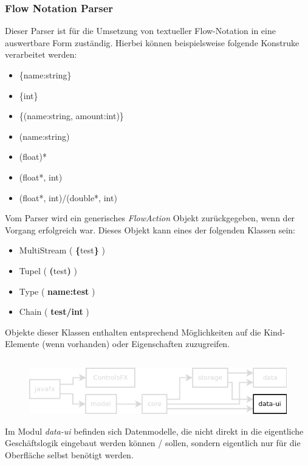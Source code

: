 \subsubsection{Flow Notation Parser}
Dieser Parser ist für die Umsetzung von textueller Flow-Notation in eine auswertbare Form zuständig. Hierbei können
beispielsweise folgende Konstruke verarbeitet werden:

\begin{itemize}
	\item \{name:string\}
	\item \{int\}
	\item \{(name:string, amount:int)\}
	\item (name:string)
	\item (float)*
	\item (float*, int)
	\item (float*, int)/(double*, int)
\end{itemize}
Vom Parser wird ein generisches \textit{FlowAction} Objekt zurückgegeben, wenn der Vorgang erfolgreich war. Dieses
Objekt kann eines der folgenden Klassen sein:

\begin{itemize}
	\item MultiStream ( \textbf{\{}test\textbf{\}} )
	\item Tupel ( \textbf{(}test\textbf{)} )
	\item Type ( \textbf{name:test} )
	\item Chain ( \textbf{test/int} )
\end{itemize}
Objekte dieser Klassen enthalten entsprechend Möglichkeiten auf die Kind-Elemente (wenn vorhanden) oder
Eigenschaften zuzugreifen.
\subsection{\textModDataUI}
\label{\textModDataUI}
\begin{figure}[H]
	\centering
	\includegraphics[width=.8\textwidth]{module_dependencies_data-ui.png}
\end{figure}

Im Modul \textit{data-ui} befinden sich Datenmodelle, die nicht direkt in die eigentliche Geschäftslogik
eingebaut werden können / sollen, sondern eigentlich nur für die Oberfläche selbst benötigt werden.

